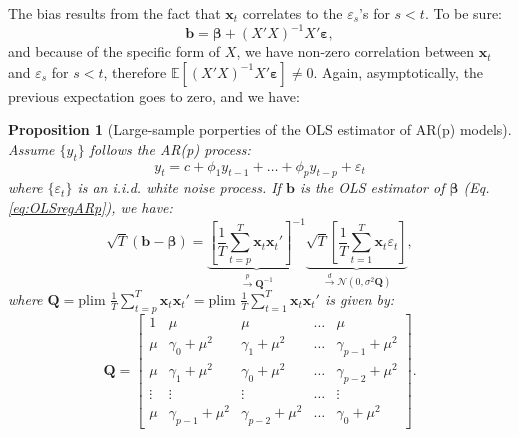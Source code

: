 \documentclass[
  12pt,
]{book}
\newtheorem{proposition}{Proposition}[chapter]
\theoremstyle{definition}
\theoremstyle{definition}
\theoremstyle{definition}
\theoremstyle{definition}
\theoremstyle{remark}
\begin{document}
The bias results from the fact that \(\mathbf{x}_t\) correlates to the \(\varepsilon_s\)'s for \(s<t\). To be sure:
\begin{equation}
\mathbf{b} = \boldsymbol{\beta} + (X'X)^{-1}X'\boldsymbol\varepsilon,\label{eq:olsar1}
\end{equation}
and because of the specific form of \(X\), we have non-zero correlation between \(\mathbf{x}_t\) and \(\varepsilon_s\) for \(s<t\), therefore \(\mathbb{E}[(X'X)^{-1}X'\boldsymbol\varepsilon] \ne 0\). Again, asymptotically, the previous expectation goes to zero, and we have:

\begin{proposition}[Large-sample porperties of the OLS estimator of AR(p) models]
\protect\hypertarget{prp:cgceOLSARp}{}\label{prp:cgceOLSARp}Assume \(\{y_t\}\) follows the AR(p) process:
\[
y_t = c + \phi_1 y_{t-1} + \dots + \phi_p y_{t-p} + \varepsilon_t
\]
where \(\{\varepsilon_{t}\}\) is an i.i.d. white noise process. If \(\mathbf{b}\) is the OLS estimator of \(\boldsymbol\beta\) (Eq. \eqref{eq:OLSregARp}), we have:
\[
\sqrt{T}(\mathbf{b}-\boldsymbol{\beta}) =  \underbrace{\left[\frac{1}{T}\sum_{t=p}^T \mathbf{x}_t\mathbf{x}_t' \right]^{-1}}_{\overset{p}{\rightarrow} \mathbf{Q}^{-1}}
\underbrace{\sqrt{T} \left[\frac{1}{T}\sum_{t=1}^T \mathbf{x}_t\varepsilon_t \right]}_{\overset{d}{\rightarrow} \mathcal{N}(0,\sigma^2\mathbf{Q})},
\]
where \(\mathbf{Q} = \mbox{plim }\frac{1}{T}\sum_{t=p}^T \mathbf{x}_t\mathbf{x}_t'= \mbox{plim }\frac{1}{T}\sum_{t=1}^T \mathbf{x}_t\mathbf{x}_t'\) is given by:
\begin{equation}
\mathbf{Q} = \left[
\begin{array}{ccccc}
1 & \mu &\mu & \dots & \mu \\
\mu & \gamma_0 + \mu^2 & \gamma_1 + \mu^2 & \dots & \gamma_{p-1} + \mu^2\\
\mu & \gamma_1 + \mu^2 & \gamma_0 + \mu^2 & \dots & \gamma_{p-2} + \mu^2\\
\vdots &\vdots &\vdots &\dots &\vdots \\
\mu & \gamma_{p-1} + \mu^2 & \gamma_{p-2} + \mu^2 & \dots & \gamma_{0} + \mu^2
\end{array}
\right].\label{eq:Qols}
\end{equation}
\end{proposition}
\end{document}
